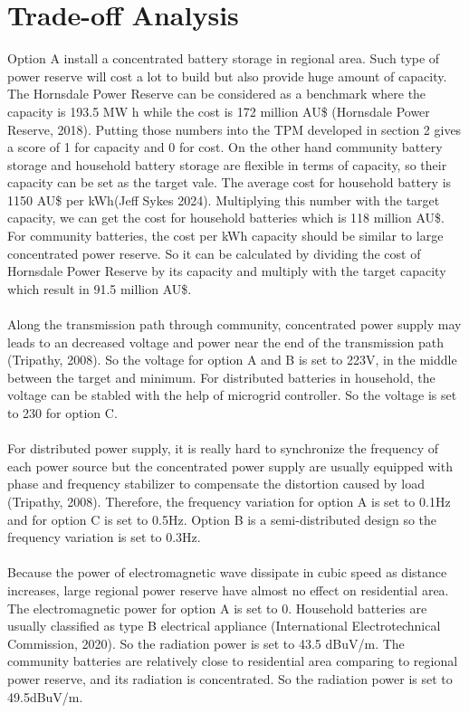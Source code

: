 \documentclass{article}
\begin{document}
\section{Trade-off Analysis}
Option A install a concentrated battery storage in regional area. Such type of power reserve will cost a lot to build but also provide huge amount of capacity. The Hornsdale Power Reserve can be considered as a benchmark where the capacity is 193.5 MW h while the cost is 172 million AU\$ (Hornsdale Power Reserve, 2018). Putting those numbers into the TPM developed in section 2 gives a score of 1 for capacity and 0 for cost. On the other hand community battery storage and household battery storage are flexible in terms of capacity, so their capacity can be set as the target vale. The average cost for household battery is 1150 AU\$ per kWh(Jeff Sykes 2024). Multiplying this number with the target capacity, we can get the cost for household batteries which is 118 million AU\$. For community batteries, the cost per kWh capacity should be similar to large concentrated power reserve. So it can be calculated by dividing the cost of Hornsdale Power Reserve by its capacity and multiply with the target capacity which result in 91.5 million AU\$.\\
\\
Along the transmission path through community, concentrated power supply may leads to an decreased voltage and power near the end of the transmission path (Tripathy, 2008). So the voltage for option A and B is set to 223V, in the middle between the target and minimum. For distributed batteries in household, the voltage can be stabled with the help of microgrid controller. So the voltage is set to 230 for option C.\\
\\
For distributed power supply, it is really hard to synchronize the frequency of each power source but the concentrated power supply are usually equipped with phase and frequency stabilizer to compensate the distortion caused by load (Tripathy, 2008). Therefore, the frequency variation for option A is set to 0.1Hz and for option C is set to 0.5Hz. Option B is a semi-distributed design so the frequency variation is set to 0.3Hz.\\
\\
Because the power of electromagnetic wave  dissipate in cubic speed as distance increases, large regional power reserve have almost no effect on residential area. The electromagnetic power for option A is set to 0. Household batteries are usually classified as type B electrical appliance (International Electrotechnical Commission, 2020). So the radiation power is set to 43.5 dBuV/m. The community batteries are relatively close to residential area comparing to regional power reserve, and its radiation is concentrated. So the radiation power is set to 49.5dBuV/m.\\
\end{document}
